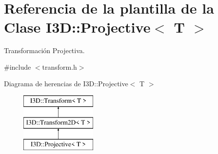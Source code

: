 \hypertarget{class_i3_d_1_1_projective}{}\section{Referencia de la plantilla de la Clase I3D\+:\+:Projective$<$ T $>$}
\label{class_i3_d_1_1_projective}


Transformación Projectiva.  




{\ttfamily \#include $<$transform.\+h$>$}

Diagrama de herencias de I3D\+:\+:Projective$<$ T $>$\begin{figure}[H]
\begin{center}
\leavevmode
\includegraphics[height=3.000000cm]{class_i3_d_1_1_projective}
\end{center}
\end{figure}
